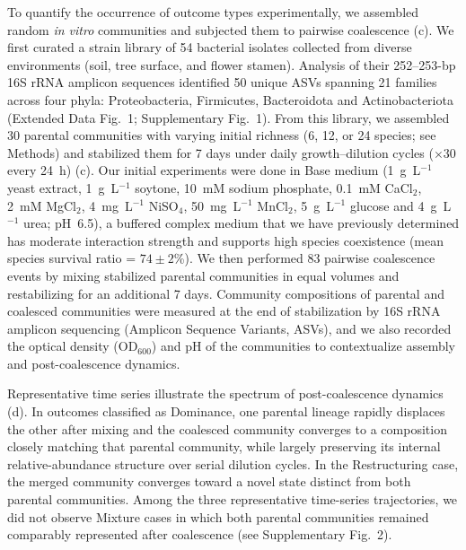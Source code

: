 To quantify the occurrence of outcome types experimentally, we assembled random \textit{in vitro} communities and subjected them to pairwise coalescence (c). We first curated a strain library of 54 bacterial isolates collected from diverse environments (soil, tree surface, and flower stamen). Analysis of their 252--253-bp 16S rRNA amplicon sequences identified 50 unique ASVs spanning 21 families across four phyla: Proteobacteria, Firmicutes, Bacteroidota and Actinobacteriota (Extended Data Fig.~1; Supplementary Fig.~1). From this library, we assembled 30 parental communities with varying initial richness (6, 12, or 24 species; see Methods) and stabilized them for 7 days under daily growth--dilution cycles ($\times$30 every 24~h) (c). Our initial experiments were done in Base medium (1~g~L$^{-1}$ yeast extract, 1~g~L$^{-1}$ soytone, 10~mM sodium phosphate, 0.1~mM CaCl$_2$, 2~mM MgCl$_2$, 4~mg~L$^{-1}$ NiSO$_4$, 50~mg~L$^{-1}$ MnCl$_2$, 5~g~L$^{-1}$ glucose and 4~g~L$^{-1}$ urea; pH~6.5), a buffered complex medium that we have previously determined has moderate interaction strength and supports high species coexistence (mean species survival ratio = $74 \pm 2$\%). We then performed 83 pairwise coalescence events by mixing stabilized parental communities in equal volumes and restabilizing for an additional 7 days. Community compositions of parental and coalesced communities were measured at the end of stabilization by 16S rRNA amplicon sequencing (Amplicon Sequence Variants, ASVs), and we also recorded the optical density (OD$_{600}$) and pH of the communities to contextualize assembly and post-coalescence dynamics.

Representative time series illustrate the spectrum of post-coalescence dynamics (d). In outcomes classified as Dominance, one parental lineage rapidly displaces the other after mixing and the coalesced community converges to a composition closely matching that parental community, while largely preserving its internal relative-abundance structure over serial dilution cycles. In the Restructuring case, the merged community converges toward a novel state distinct from both parental communities. Among the three representative time-series trajectories, we did not observe Mixture cases in which both parental communities remained comparably represented after coalescence (see Supplementary Fig.~2).

